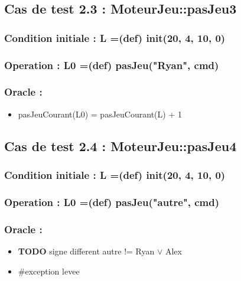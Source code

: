 \documentclass[11pt]{article}
\begin{document}
\subsection{Cas de test 2.3 : MoteurJeu::pasJeu3}
\label{sec-1.8}

\subsubsection{Condition initiale : L =(def) init(20, 4, 10, 0)}
\label{sec-1.8.1}

\subsubsection{Operation : L0 =(def) pasJeu("Ryan", cmd)}
\label{sec-1.8.2}

\subsubsection{Oracle :}
\label{sec-1.8.3}

\begin{itemize}

\item pasJeuCourant(L0) = pasJeuCourant(L) + 1\\
\label{sec-1.8.3.1}


\end{itemize} %
\subsection{Cas de test 2.4 : MoteurJeu::pasJeu4}
\label{sec-1.9}

\subsubsection{Condition initiale : L =(def) init(20, 4, 10, 0)}
\label{sec-1.9.1}

\subsubsection{Operation : L0 =(def) pasJeu("autre", cmd)}
\label{sec-1.9.2}

\subsubsection{Oracle :}
\label{sec-1.9.3}

\begin{itemize}

\item \textbf{TODO} signe different autre != Ryan $\vee$ Alex\\
\label{sec-1.9.3.1}


\item \#exception levee\\
\label{sec-1.9.3.2}





\end{itemize} %
\end{document}
